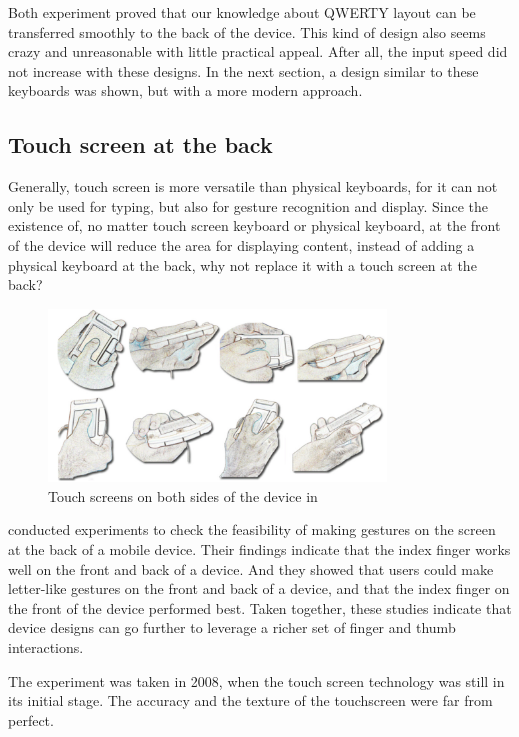 \documentclass[11pt]{article}
\begin{document}
Both experiment proved that our knowledge about QWERTY layout can be transferred smoothly to the back of the device. This kind of design also seems crazy and unreasonable with little practical appeal. After all, the input speed did not increase with these designs. In the next section, a design similar to these keyboards was shown, but with a more modern approach.

\subsection{Touch screen at the back}
Generally, touch screen is more versatile than physical keyboards, for it can not only be used for typing, but also for gesture recognition and display. Since the existence of, no matter touch screen keyboard or physical keyboard, at the front of the device will reduce the area for displaying content, instead of adding a physical keyboard at the back, why not replace it with a touch screen at the back?

\begin{figure}[H]
  \centering
  \includegraphics[width=0.8\textwidth]{HandPostureFrontBack.png}
  \caption{Touch screens on both sides of the device in \citep{handposture2008}}
  \label{fig:handposturefrontback}
\end{figure}

\citet{handposture2008} conducted experiments to check the feasibility of making gestures on the screen at the back of a mobile device. Their findings indicate that the index finger works well on the front and back of a device. And they showed that users could make letter-like gestures on the front and back of a device, and that the index finger on the front of the device performed best. Taken together, these studies indicate that device designs can go further to leverage a richer set of finger and thumb interactions. 

The experiment was taken in 2008, when the touch screen technology was still in its initial stage. The accuracy and the texture of the touchscreen were far from perfect.
\end{document}
